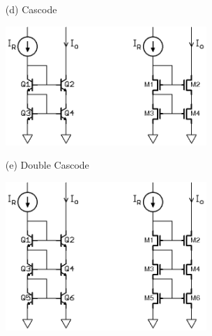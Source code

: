 \documentclass[11pt,twoside]{article}
\begin{document}
\begin{enumerate}
	\item[(d)] Cascode
\begin{center}
\includegraphics[width=0.6\textwidth]{cascode.png}
\end{center}

	\item[(e)] Double Cascode
\begin{center}
\includegraphics[width=0.6\textwidth]{double-cascode.png}
\end{center}
	
\end{enumerate}
\end{document}
